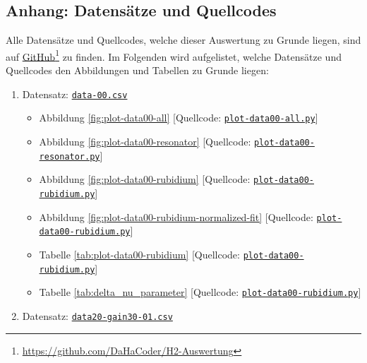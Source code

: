 \begin{appendix}


\chapter{Anhang: Datensätze und Quellcodes}
\label{app:data-and-source-code}

Alle Datensätze und Quellcodes, welche dieser Auswertung zu Grunde liegen, sind auf \href{https://github.com/DaHaCoder/H2-Auswertung}{GitHub}\footnote{\href{https://github.com/DaHaCoder/H2-Auswertung}{https://github.com/DaHaCoder/H2-Auswertung}} zu finden. 
Im Folgenden wird aufgelistet, welche Datensätze und Quellcodes den Abbildungen und Tabellen zu Grunde liegen:
\begin{enumerate}[1.]
    \item Datensatz: \href{https://github.com/DaHaCoder/H2-Auswertung/blob/main/data/data00.csv}{\lstinline{data-00.csv}} 
    \begin{itemize}
        \item Abbildung \ref{fig:plot-data00-all} [Quellcode: \href{https://github.com/DaHaCoder/H2-Auswertung/blob/main/code/plot-data00-all.py}{\lstinline{plot-data00-all.py}}]
        \item Abbildung \ref{fig:plot-data00-resonator} [Quellcode: \href{https://github.com/DaHaCoder/H2-Auswertung/blob/main/code/plot-data00-resonator.py}{\lstinline{plot-data00-resonator.py}}]
        \item Abbildung \ref{fig:plot-data00-rubidium} [Quellcode: \href{https://github.com/DaHaCoder/H2-Auswertung/blob/main/code/plot-data00-rubidium.py}{\lstinline{plot-data00-rubidium.py}}]
        \item Abbildung \ref{fig:plot-data00-rubidium-normalized-fit} [Quellcode: \href{https://github.com/DaHaCoder/H2-Auswertung/blob/main/code/plot-data00-rubidium.py}{\lstinline{plot-data00-rubidium.py}}]
        \item Tabelle \ref{tab:plot-data00-rubidium} [Quellcode: \href{https://github.com/DaHaCoder/H2-Auswertung/blob/main/code/plot-data00-rubidium.py}{\lstinline{plot-data00-rubidium.py}}]
        \item Tabelle \ref{tab:delta_nu_parameter} [Quellcode: \href{https://github.com/DaHaCoder/H2-Auswertung/blob/main/code/plot-data00-rubidium.py}{\lstinline{plot-data00-rubidium.py}}]
    \end{itemize}
    \item Datensatz: \href{https://github.com/DaHaCoder/H2-Auswertung/blob/main/data/data20-gain30-01.csv}{\lstinline{data20-gain30-01.csv}}

\end{enumerate}
\end{appendix}
